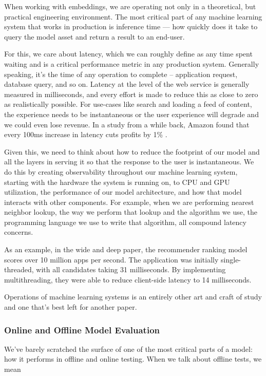 \documentclass[11pt, table]{diazessay} %
\begin{document}
\begin{sloppypar}
When working with embeddings, we are operating not only in a theoretical, but practical engineering environment. The most critical part of any machine learning system that works in production is inference time --- how quickly does it take to query the model asset and return a result to an end-user.

For this, we care about latency, which we can roughly define as any time spent waiting and is a critical performance metric in any production system\citep{gregg2014systems}. Generally speaking, it's the time of any operation to complete -- application request, database query, and so on. Latency at the level of the web service is generally measured in milliseconds, and every effort is made to reduce this as close to zero as realistically possible. For use-cases like search and loading a feed of content, the experience needs to be instantaneous or the user experience will degrade and we could even lose revenue. In a study from a while back, Amazon found that every 100ms increase in latency cuts profits by 1\% \citep{flach2013reducing}.

Given this, we need to think about how to reduce the footprint of our model and all the layers in serving it so that the response to the user is instantaneous. We do this by creating observability throughout our machine learning system, starting with the hardware the system is running on, to CPU and GPU utilization, the performance of our model architecture, and how that model interacts with other components. For example, when we are performing nearest neighbor lookup, the way we perform that lookup and the algorithm we use, the programming language we use to write that algorithm, all compound latency concerns.  

As an example, in the wide and deep paper, the recommender ranking model scores over 10 million apps per second. The application was initially single-threaded, with all candidates taking 31 milliseconds. By implementing multithreading, they were able to reduce client-side latency to 14 milliseconds\citep{cheng2016wide}.

Operations of machine learning systems is an entirely other art and craft of study and one that's best left for another paper\citep{kreuzberger2022machine}.

\subsubsection{Online and Offline Model Evaluation}
We've barely scratched the surface of one of the most critical parts of a model: how it performs in offline and online testing. When we talk about offline tests, we mean


\end{sloppypar}
\end{document}
